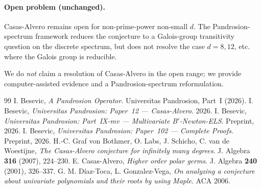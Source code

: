 \documentclass[11pt,a4paper]{article}
\begin{document}
\paragraph{Open problem (unchanged).}
Casas-Alvero remains open for non-prime-power non-small $d$. The Pandrosion-spectrum framework reduces the conjecture to a Galois-group transitivity question on the discrete spectrum, but does not resolve the case $d = 8, 12$, etc. where the Galois group is reducible.

We do \emph{not} claim a resolution of Casas-Alvero in the open range; we provide computer-assisted evidence and a Pandrosion-spectrum reformulation.

\begin{thebibliography}{99}
 I. Besevic, \textit{A Pandrosion Operator}. Universitas Pandrosion, Part~I (2026).
 I. Besevic, \textit{Universitas Pandrosion: Paper~12 --- Casas-Alvero}. 2026.
 I. Besevic, \textit{Universitas Pandrosion: Part~IX-mv --- Multivariate B$'$-Newton-ELS}. Preprint, 2026.
 I. Besevic, \textit{Universitas Pandrosion: Paper~102 --- Complete Proofs}. Preprint, 2026.
 H.-C. Graf von Bothmer, O. Labs, J. Schicho, C. van de Woestijne, \textit{The Casas-Alvero conjecture for infinitely many degrees}. J. Algebra \textbf{316} (2007), 224--230.
 E. Casas-Alvero, \textit{Higher order polar germs}. J. Algebra \textbf{240} (2001), 326--337.
 G. M. D{\'i}az-Toca, L. Gonzalez-Vega, \textit{On analyzing a conjecture about univariate polynomials and their roots by using Maple}. ACA 2006.
\end{thebibliography}
\end{document}
